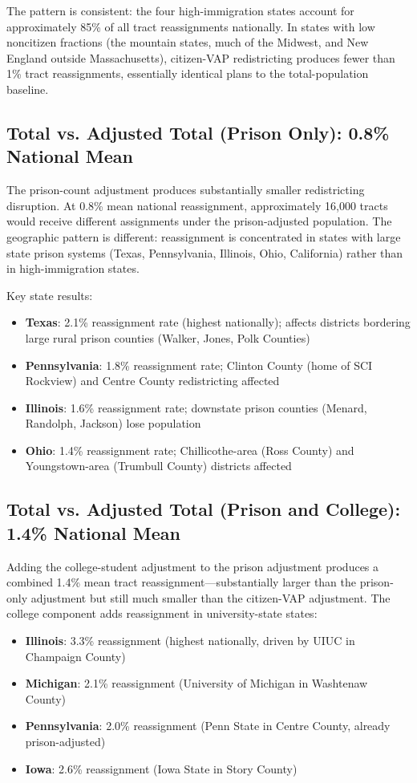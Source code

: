 The pattern is consistent: the four high-immigration states account for approximately 85\% of all tract reassignments nationally. In states with low noncitizen fractions (the mountain states, much of the Midwest, and New England outside Massachusetts), citizen-VAP redistricting produces fewer than 1\% tract reassignments, essentially identical plans to the total-population baseline.

\subsection{Total vs. Adjusted Total (Prison Only): 0.8\% National Mean}

The prison-count adjustment produces substantially smaller redistricting disruption. At 0.8\% mean national reassignment, approximately 16,000 tracts would receive different assignments under the prison-adjusted population. The geographic pattern is different: reassignment is concentrated in states with large state prison systems (Texas, Pennsylvania, Illinois, Ohio, California) rather than in high-immigration states.

Key state results:
\begin{itemize}
    \item \textbf{Texas}: 2.1\% reassignment rate (highest nationally); affects districts bordering large rural prison counties (Walker, Jones, Polk Counties)
    \item \textbf{Pennsylvania}: 1.8\% reassignment rate; Clinton County (home of SCI Rockview) and Centre County redistricting affected
    \item \textbf{Illinois}: 1.6\% reassignment rate; downstate prison counties (Menard, Randolph, Jackson) lose population
    \item \textbf{Ohio}: 1.4\% reassignment rate; Chillicothe-area (Ross County) and Youngstown-area (Trumbull County) districts affected
\end{itemize}

\subsection{Total vs. Adjusted Total (Prison and College): 1.4\% National Mean}

Adding the college-student adjustment to the prison adjustment produces a combined 1.4\% mean tract reassignment---substantially larger than the prison-only adjustment but still much smaller than the citizen-VAP adjustment. The college component adds reassignment in university-state states:
\begin{itemize}
    \item \textbf{Illinois}: 3.3\% reassignment (highest nationally, driven by UIUC in Champaign County)
    \item \textbf{Michigan}: 2.1\% reassignment (University of Michigan in Washtenaw County)
    \item \textbf{Pennsylvania}: 2.0\% reassignment (Penn State in Centre County, already prison-adjusted)
    \item \textbf{Iowa}: 2.6\% reassignment (Iowa State in Story County)
\end{itemize}

